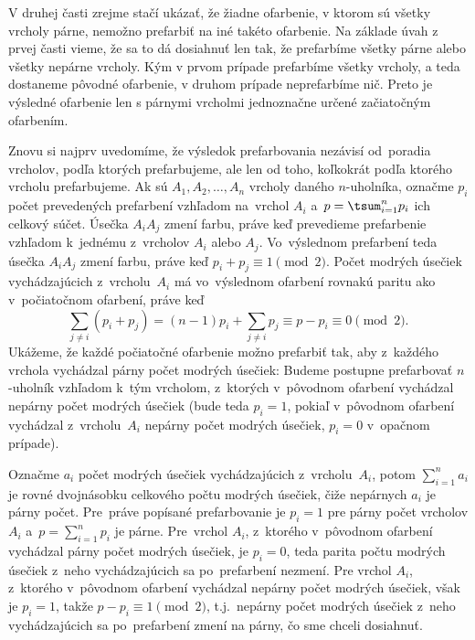 {V druhej časti zrejme stačí ukázať, že žiadne ofarbenie, v ktorom sú
všetky vrcholy párne, nemožno prefarbiť na iné takéto ofarbenie.
Na základe úvah z prvej časti vieme, že sa to dá dosiahnuť len tak, že
prefarbíme všetky párne alebo všetky nepárne vrcholy. Kým v prvom
prípade prefarbíme všetky vrcholy, a teda dostaneme pôvodné ofarbenie,
v druhom prípade neprefarbíme nič.
Preto je výsledné ofarbenie len s párnymi
vrcholmi jednoznačne určené začiatočným ofarbením.

\ineriesenie
Znovu si najprv uvedomíme, že výsledok prefarbovania nezávisí od~poradia
vrcholov, podľa ktorých prefarbujeme, ale len od toho, koľkokrát
podľa ktorého vrcholu prefarbujeme. Ak sú $A_1,A_2,\ldots,A_n$
vrcholy daného $n$-uholníka, označme $p_i$ počet prevedených
prefarbení vzhľadom na~vrchol $A_i$ a~$p=\tsum_{i=1}^np_i$ ich
celkový súčet. Úsečka $A_iA_j$ zmení
farbu, práve keď prevedieme prefarbenie vzhľadom k~jednému
z~vrcholov $A_i$ alebo $A_j$. Vo~výslednom prefarbení teda úsečka
$A_iA_j$ zmení farbu, práve keď $p_i+p_j\equiv 1\pmod 2$. Počet
modrých úsečiek vychádzajúcich z~vrcholu~$A_i$ má vo~výslednom
ofarbení rovnakú paritu ako v~počiatočnom ofarbení, práve keď
$$
\sum\limits_{j\ne i}(p_i+p_j)=(n-1)p_i+\sum\limits_{j\ne
i}p_j\equiv p-p_i\equiv 0\pmod 2.
$$
Ukážeme, že každé počiatočné ofarbenie možno prefarbiť tak, aby
z~každého vrchola vychádzal párny počet modrých úsečiek: Budeme
postupne prefarbovať $n$-uholník
vzhľadom k~tým vrcholom, z~ktorých v~pôvodnom
ofarbení vychádzal nepárny počet modrých úsečiek (bude teda $p_i=1$,
pokiaľ v~pôvodnom ofarbení vychádzal z~vrcholu~$A_i$ nepárny počet
modrých úsečiek, $p_i=0$ v~opačnom prípade).

Označme $a_i$ počet modrých úsečiek vychádzajúcich
z~vrcholu~$A_i$, potom $\sum\limits_{i=1}^na_i$ je
rovné dvojnásobku celkového
počtu modrých úsečiek, čiže nepárnych $a_i$ je párny počet.
Pre~práve popísané prefarbovanie je $p_i=1$ pre párny počet vrcholov
$A_i$ a~$p=\sum\limits_{i=1}^np_{i}$ je párne. Pre~vrchol $A_i$,
z~ktorého v~pôvodnom ofarbení vychádzal párny počet modrých úsečiek, je
$p_i=0$, teda parita počtu modrých úsečiek z~neho vychádzajúcich sa
po~prefarbení nezmení. Pre vrchol $A_i$, z~ktorého
v~pôvodnom ofarbení vychádzal nepárny počet modrých úsečiek, však je
$p_i=1$, takže $p-p_i\equiv 1\pmod 2$, t.j.~nepárny počet modrých
úsečiek z~neho vychádzajúcich sa po~prefarbení zmení na párny, čo sme
chceli dosiahnuť.

}
